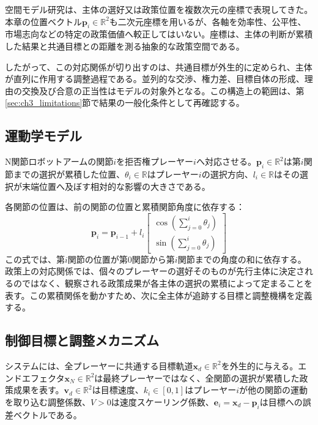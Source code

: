 空間モデル研究は、主体の選好又は政策位置を複数次元の座標で表現してきた\cite{curini2009electoral, adams2000geometry}。本章の位置ベクトル$\mathbf{p}_i \in \mathbb{R}^2$も二次元座標を用いるが、各軸を効率性、公平性、市場志向などの特定の政策価値へ較正してはいない。座標は、主体の判断が累積した結果と共通目標との距離を測る抽象的な政策空間である。

したがって、この対応関係が切り出すのは、共通目標が外生的に定められ、主体が直列に作用する調整過程である。並列的な交渉、権力差、目標自体の形成、理由の交換及び合意の正当性はモデルの対象外となる。この構造上の範囲は、第\ref{sec:ch3_limitations}節で結果の一般化条件として再確認する。

\subsection{運動学モデル}

N関節ロボットアームの関節$i$を拒否権プレーヤー$i$へ対応させる。$\mathbf{p}_i \in \mathbb{R}^2$は第$i$関節までの選択が累積した位置、$\theta_i \in \mathbb{R}$はプレーヤー$i$の選択方向、$l_i \in \mathbb{R}$はその選択が末端位置へ及ぼす相対的な影響の大きさである。

各関節の位置は、前の関節の位置と累積関節角度に依存する：
\begin{equation}
\mathbf{p}_i = \mathbf{p}_{i-1} + l_i \begin{bmatrix} \cos(\sum_{j=0}^{i}\theta_j) \\ \sin(\sum_{j=0}^{i}\theta_j) \end{bmatrix}
\end{equation}
この式では、第$i$関節の位置が第$0$関節から第$i$関節までの角度の和に依存する。政策上の対応関係では、個々のプレーヤーの選好そのものが先行主体に決定されるのではなく、観察される政策成果が各主体の選択の累積によって定まることを表す。この累積関係を動かすため、次に全主体が追跡する目標と調整機構を定義する。

\subsection{制御目標と調整メカニズム}

システムには、全プレーヤーに共通する目標軌道$\mathbf{x}_d \in \mathbb{R}^2$を外生的に与える。エンドエフェクタ$\mathbf{x}_N \in \mathbb{R}^2$は最終プレーヤーではなく、全関節の選択が累積した政策成果を表す。$\mathbf{v}_d \in \mathbb{R}^2$は目標速度、$k_i \in [0,1]$はプレーヤー$i$が他の関節の運動を取り込む調整係数、$V > 0$は速度スケーリング係数、$\mathbf{e}_i = \mathbf{x}_d - \mathbf{p}_i$は目標への誤差ベクトルである。

